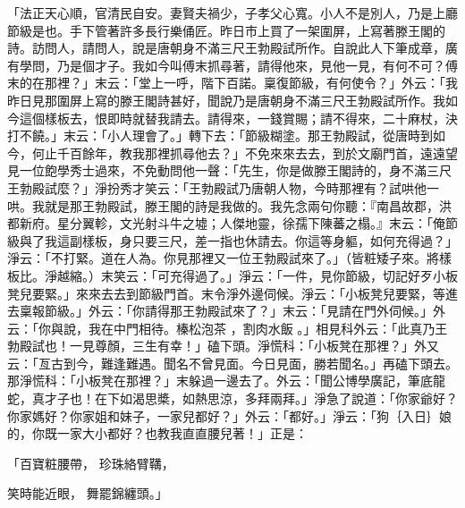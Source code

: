\begin{showcontents}{}
「法正天心順，官清民自安。妻賢夫禍少，子孝父心寬。小人不是別人，乃是上廳節級是也。手下管著許多長行樂俑匠。昨日市上買了一架圍屏，上寫著滕王閣的詩。訪問人，請問人，說是唐朝身不滿三尺王勃殿試所作。自說此人下筆成章，廣有學問，乃是個才子。我如今叫傅末抓尋著，請得他來，見他一見，有何不可？傅末的在那裡？」末云：「堂上一呼，階下百諾。稟復節級，有何使令？」外云：「我昨日見那圍屏上寫的滕王閣詩甚好，聞說乃是唐朝身不滿三尺王勃殿試所作。我如今這個樣板去，恨即時就替我請去。請得來，一錢賞賜；請不得來，二十麻杖，決打不饒。」末云：「小人理會了。」轉下去：「節級糊塗。那王勃殿試，從唐時到如今，何止千百餘年，教我那裡抓尋他去？」不免來來去去，到於文廟門首，遠遠望見一位飽學秀士過來，不免動問他一聲：「先生，你是做滕王閣詩的，身不滿三尺王勃殿試麼？」淨扮秀才笑云：「王勃殿試乃唐朝人物，今時那裡有？試哄他一哄。我就是那王勃殿試，滕王閣的詩是我做的。我先念兩句你聽：『南昌故郡，洪都新府。星分翼軫，文光射斗牛之墟；人傑地靈，徐孺下陳蕃之榻。』末云：「俺節級與了我這副樣板，身只要三尺，差一指也休請去。你這等身軀，如何充得過？」淨云：「不打緊。道在人為。你見那裡又一位王勃殿試來了。」（皆粧矮子來。將樣板比。淨越縮。）末笑云：「可充得過了。」淨云：「一件，見你節級，切記好歹小板凳兒要緊。」來來去去到節級門首。末令淨外邊伺候。淨云：「小板凳兒要緊，等進去稟報節級。」外云：「你請得那王勃殿試來了？」末云：「見請在門外伺候。」外云：「你與說，我在中門相待。榛松泡茶 ，割肉水飯 。」相見科外云：「此真乃王勃殿試也！一見尊顏，三生有幸！」磕下頭。淨慌科：「小板凳在那裡？」外又云：「亙古到今，難逢難遇。聞名不曾見面。今日見面，勝若聞名。」再磕下頭去。那淨慌科：「小板凳在那裡？」末躲過一邊去了。外云：「聞公博學廣記，筆底龍蛇，真才子也！在下如渴思槳，如熱思涼，多拜兩拜。」淨急了說道：「你家爺好？你家媽好？你家姐和妹子，一家兒都好？」外云：「都好。」淨云：「狗｛入日｝娘的，你既一家大小都好？也教我直直腰兒著！」正是：

「百寶粧腰帶，  珍珠絡臂鞲，

笑時能近眼，  舞罷錦纏頭。」


\end{showcontents}
